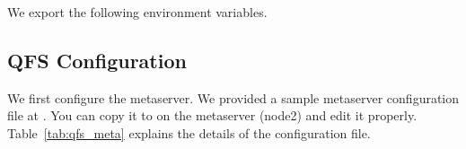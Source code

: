 \documentclass[letterpaper,12pt]{article}
\begin{document}
We export the following environment variables.

\begin{center}
\noindent{}
\end{center}



\subsection{QFS Configuration}

We first configure the metaserver.  We provided a sample metaserver
configuration file at
.
You can copy it to  on the
metaserver (node2) and edit it properly.  Table~\ref{tab:qfs_meta} explains
the details of the configuration file.
\end{document}
